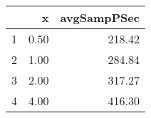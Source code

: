 \begin{table}[h]
\centering
\begin{tabular}{rrr}
  \hline
 & x & avgSampPSec \\ 
  \hline
1 & 0.50 & 218.42 \\ 
   \hline
2 & 1.00 & 284.84 \\ 
   \hline
3 & 2.00 & 317.27 \\ 
   \hline
4 & 4.00 & 416.30 \\ 
   \hline
\end{tabular}
\end{table}
